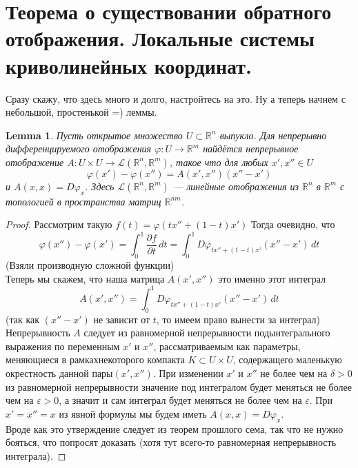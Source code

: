 \documentclass[a4paper,12pt]{article} %
\newtheorem{lemma}[theorem]{Lemma}
\theoremstyle{definition}
\begin{document}
\section{Теорема о существовании обратного отображения. Локальные системы криволинейных координат.}
Сразу скажу, что здесь много и долго, настройтесь на это. Ну а теперь начнем с небольшой, простенькой =) леммы.
\begin{lemma}
	Пусть открытое множество $U \subset \mathbb{R}^n$ выпукло. Для непрерывно дифференцируемого отображения $\varphi : U \rightarrow \mathbb{R}^m$ найдётся непрерывное отображение $A : U \times U \rightarrow \mathcal{L} (\mathbb{R}^n,\mathbb{R}^m)$, такое что для любых $x',x'' \in U$
	\begin{equation}
		\varphi(x') - \varphi(x'') = A(x', x'')(x'' - x')
	\end{equation}
	и $A(x, x) = D \varphi_x$. Здесь $ \mathcal{L} (\mathbb{R}^n,\mathbb{R}^m)$ --- линейные отображения из $\mathbb{R}^n$ в $\mathbb{R}^m$ с топологией в пространства матриц $\mathbb{R}^{nm}$.
\end{lemma}
\begin{proof}
	Рассмотрим такую $f(t) = \varphi (t x'' + (1 - t) x')$ Тогда очевидно, что 
	\begin{equation}
		\varphi(x'') - \varphi(x') = \int_0^1 \frac{\partial f}{\partial t} \, dt = \int_0^1 D \varphi_{t x'' + (1 - t) x'}  (x'' - x') \, dt
	\end{equation}
	(Взяли производную сложной функции)\\
	Теперь мы скажем, что наша матрица $A(x', x'')$ это именно этот интеграл
	\begin{equation}
		A(x', x'') = \int_0^1 D \varphi_{t x'' + (1 - t) x'}  (x'' - x') \, dt
	\end{equation}
	(так как $(x'' - x')$ не зависит от $t$, то имеем право вынести за интеграл)\\
	Непрерывность $A$ следует из равномерной непрерывности подынтегрального выражения по переменным $x'$ и $x''$, рассматриваемым как параметры, меняющиеся в рамкахнекоторого компакта $K \subset U \times U$, содержащего маленькую окрестность данной пары$(x', x'')$. При изменении $x'$ и $x''$ не более чем на $\delta  > 0$ из равномерной непрерывности
	значение под интегралом будет меняться не более чем на $\varepsilon > 0$, а значит и сам интеграл будет меняться не более чем на $\varepsilon$. При $x'=x''=x$ из явной формулы мы будем иметь $A(x,x) =D \varphi_x$. \\
	Вроде как это утверждение следует из теорем прошлого сема, так что не нужно бояться, что попросят доказать (хотя тут всего-то равномерная непрерывность интеграла).
\end{proof}
\end{document}
